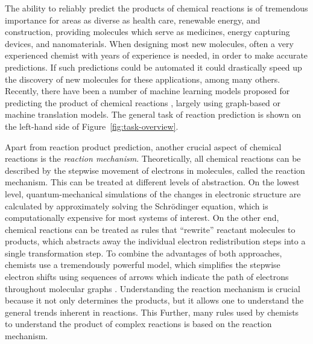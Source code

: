 
The ability to reliably predict the products of chemical reactions is of tremendous importance for areas as diverse as health care, renewable energy, and construction, providing molecules which serve as medicines, energy capturing devices, and nanomaterials. 
When designing most new molecules, often a very experienced chemist with years of experience is needed, in order to make accurate predictions. 
If such predictions could be automated it could drastically speed up the discovery of new molecules for these applications, among many others. Recently, there have been a number of machine learning models proposed for predicting the product of chemical reactions \cite{coley2017prediction,jin2017predicting,neural-symbolic,schwaller2017found,wei2016neural,zhang2005structure}, largely using graph-based or machine translation models. The general task of reaction prediction is shown on the left-hand side of Figure~\ref{fig:task-overview}.

Apart from reaction product prediction, another crucial aspect of chemical reactions is the \emph{reaction mechanism}. Theoretically, all chemical reactions can be described by the stepwise movement of electrons in molecules, called the reaction mechanism.
This can be treated at different levels of abstraction. On the lowest level, quantum-mechanical simulations of the  changes in electronic structure are calculated by approximately solving the Schrödinger equation, which is computationally expensive for most systems of interest. 
On the other end, chemical reactions can be treated as rules that ``rewrite'' reactant molecules to products, which abstracts away the individual electron redistribution steps into a single transformation step. 
To combine the advantages of both approaches, chemists use a tremendously powerful model, which simplifies the stepwise electron shifts using sequences of arrows which indicate the path of electrons throughout molecular graphs \cite{herges1994organizing}. 
Understanding the reaction mechanism is crucial because it not only determines the products, but it allows one to understand the general trends inherent in reactions. This Further, many rules used by chemists to understand the product of complex reactions is based on the reaction mechanism.


